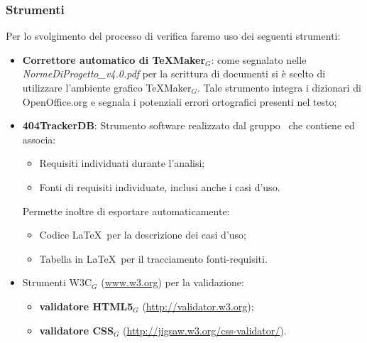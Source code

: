 \subsubsection{Strumenti}
Per lo svolgimento del processo di verifica faremo uso dei seguenti strumenti:
\begin{itemize}
	\item \textbf{Correttore automatico di TeXMaker$_G$}: come segnalato nelle \textit{NormeDiProgetto\_v4.0.pdf} per la scrittura di documenti si è scelto di utilizzare l'ambiente grafico TeXMaker$_G$. Tale strumento integra i dizionari di OpenOffice.org e segnala i potenziali
	errori ortografici presenti nel testo;

	\item \textbf{404TrackerDB}: Strumento software realizzato dal gruppo \gruppo\ che contiene ed associa:
	\begin{itemize}
		\item Requisiti individuati durante l'analisi;
		\item Fonti di requisiti individuate, inclusi anche i casi d'uso.
	\end{itemize}
	Permette inoltre di esportare automaticamente:
	\begin{itemize}
		\item Codice \LaTeX\ per la descrizione dei casi d'uso;
		\item Tabella in \LaTeX\ per il tracciamento fonti-requisiti.
	\end{itemize}

	\item Strumenti W3C$_G$ (\href{www.w3.org}{www.w3.org}) per la validazione:
	    \begin{itemize}
	    	\item \textbf{validatore HTML5$_G$} (\href{http://validator.w3.org}{http://validator.w3.org});
	    	\item \textbf{validatore CSS$_G$}
	    	(\href{http://jigsaw.w3.org/css-validator/}{http://jigsaw.w3.org/css-validator/}).
	    \end{itemize}
	

\end{itemize}
